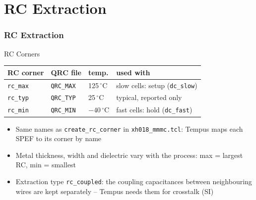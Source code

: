 \documentclass{beamer}
\newcommand{\astitle}{nix}
\newcommand{\assubtitle}{nix}
\newcommand{\cmd}[1]{\texttt{#1}}
\begin{document}
\section{RC Extraction}
\renewcommand{\astitle}{RC Extraction}

\renewcommand{\assubtitle}{RC Corners}
\begin{frame}
\frametitle{\astitle}
\begin{block}{\assubtitle}
  \footnotesize
  \begin{tabularx}{\linewidth}{@{}lllY@{}}
    \textbf{RC corner} & \textbf{QRC file} & \textbf{temp.} & \textbf{used with}\\\hline
    \cmd{rc\_max} & \cmd{QRC\_MAX} & 125\,$^\circ$C & slow cells: setup (\cmd{dc\_slow})\\
    \cmd{rc\_typ} & \cmd{QRC\_TYP} & 25\,$^\circ$C  & typical, reported only\\
    \cmd{rc\_min} & \cmd{QRC\_MIN} & $-40$\,$^\circ$C & fast cells: hold (\cmd{dc\_fast})\\
  \end{tabularx}
  \vspace{4pt}
  \begin{itemize}
    \item Same names as \cmd{create\_rc\_corner} in
      \cmd{xh018\_mmmc.tcl}: Tempus maps each SPEF to its corner by name
    \item Metal thickness, width and dielectric vary with the process: max
      = largest RC, min = smallest
    \item Extraction type \cmd{rc\_coupled}: the coupling capacitances
      between neighbouring wires are kept separately -- Tempus needs them
      for crosstalk (SI)
  \end{itemize}
\end{block}
\end{frame}
\end{document}
